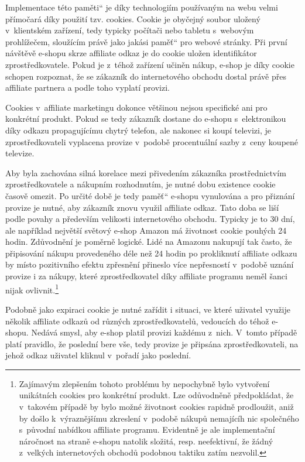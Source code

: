 \documentclass[12pt,twoside,openany]{fithesis}
\begin{document}
Implementace této \glqq paměti\textquotedblleft{} je díky technologiím 
používaným na webu velmi přímočará díky použití tzv. cookies. Cookie 
je obyčejný soubor uložený v~klientském zařízení, tedy typicky 
počítači nebo tabletu s~webovým prohlížečem, sloužícím právě jako 
jakási \glqq paměť\textquotedblleft{} pro webové stránky. 
\cite{rfc-cookie}{} Při první návštěvě e-shopu skrze affiliate odkaz je 
do cookie uložen identifikátor zprostředkovatele. Pokud je z~téhož 
zařízení učiněn nákup, e-shop je díky cookie schopen rozpoznat, že se 
zákazník do internetového obchodu dostal právě přes affiliate partnera a 
podle toho vyplatí provizi.

Cookies v~affiliate marketingu dokonce většinou nejsou specifické ani pro 
konkrétní produkt. Pokud se tedy zákazník dostane do e-shopu s~elektronikou 
díky odkazu propagujícímu chytrý telefon, ale nakonec si koupí televizi, 
je zprostředkovateli vyplacena provize v~podobě procentuální sazby z~ceny 
koupené televize.

Aby byla zachována silná korelace mezi přivedením zákazníka 
prostřednictvím zprostředkovatele a nákupním rozhodnutím, je nutné dobu 
existence cookie časově omezit. Po určité době je tedy \glqq 
paměť\textquotedblleft{} e-shopu vynulována a pro přiznání provize je 
nutné, aby zákazník znovu využil affiliate odkaz. Tato doba se liší podle 
povahy a především velikosti internetového obchodu. Typicky je to 30 dní, 
ale například největší světový e-shop Amazon má životnost cookie 
pouhých 24 hodin. \cite{amazon-cookie}{} Zdůvodnění je poměrně logické. 
Lidé na Amazonu nakupují tak často, že připisování nákupu provedeného 
déle než 24 hodin po prokliknutí affiliate odkazu by místo pozitivního 
efektu zpřesnění přineslo více nepřesností v~podobě uznání provize i 
za nákupy, které zprostředkovatel díky affiliate programu neměl šanci 
nijak ovlivnit.\footnote{
    Zajímavým zlepšením tohoto problému by nepochybně bylo vytvoření 
unikátních cookies pro konkrétní produkt. Lze odůvodněně předpokládat, 
že v~takovém případě by bylo možné životnost cookies rapidně 
prodloužit, aniž by došlo k~výraznějšímu zkreslení v~podobě nákupů 
nemajícíh nic společného s~původní nabídkou affiliate programu. 
Evidentně je ale implementační náročnost na straně e-shopu natolik 
složitá, resp. neefektivní, že žádný z~velkých internetových obchodů 
podobnou taktiku zatím nezvolil.}

Podobně jako expiraci cookie je nutné zařídit i situaci, ve které 
uživatel využije několik affiliate odkazů od různých zprostředkovatelů, 
vedoucích do téhož e-shopu. Nedává smysl, aby e-shop platil provizi 
každému z~nich. V~tomto případě platí pravidlo, že poslední bere vše, 
tedy provize je připsána zprostředkovateli, na jehož odkaz uživatel 
kliknul v~pořadí jako poslední.
\end{document}
